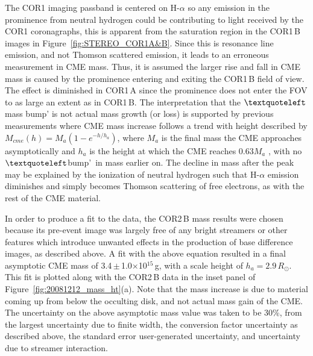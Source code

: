 \clearpage
The COR1 imaging passband is centered on H-$\alpha$ so any emission in the prominence from neutral hydrogen could be contributing to light received by the COR1 coronagraphs, this is apparent from the saturation region in the COR1\,B images in Figure~\ref{fig:STEREO_COR1A&B}. Since this is resonance line emission, and not Thomson scattered emission, it leads to an erroneous measurement in CME mass. Thus, it is assumed the larger rise and fall in 
CME mass is caused by the prominence entering and exiting the COR1\,B field of view. The effect is diminished in COR1\,A since the prominence does not enter the FOV to as large an extent as in COR1\,B. The interpretation that the $\textquoteleft$mass bump' is not actual mass growth (or loss) is supported by previous measurements where CME mass increase follows a trend with height described by $M_{cme}(h)=M_{a}(1-e^{-h/h_a})$, where $M_a$ is the final mass the CME approaches asymptotically and $h_a$ is the height at which the CME reaches 0.63$M_a$ \citep
{cola09}, with no  $\textquoteleft$bump'~in mass earlier on. The decline in mass after the peak may be explained by the ionization of neutral hydrogen such that H-$\alpha$ emission diminishes and simply becomes Thomson scattering of free electrons, as with the rest of the CME material. 

In order to produce a fit to the data, the COR2\,B mass results were chosen because its pre-event image was largely free of any bright streamers or other features which introduce unwanted effects in the production of base difference images, as described above. A fit with the above equation resulted in a final asymptotic CME mass of 3.4\,$\pm$\,1.0$\times$10$^{15}$\,g, with a scale height of $h_a=2.9\,R_{\odot}$. This fit is plotted along with the COR2\,B data in the inset panel of Figure~\ref{fig:20081212_mass_ht}(a). Note that the mass increase is due to material coming up from below the occulting disk, and not actual mass gain of the CME. The uncertainty on the above asymptotic mass value was taken to be 30\%, from the largest uncertainty  due to finite width, the conversion factor uncertainty as described above, the standard error user-generated uncertainty, and uncertainty due to streamer interaction.

